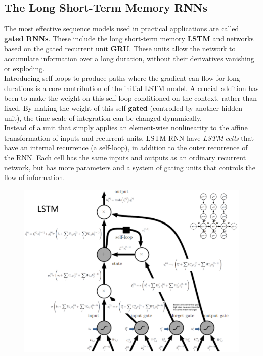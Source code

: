 \begin{multicols}{2}
	\subsection{The Long Short-Term Memory RNNs}
	The most effective sequence models used in practical applications are called \textbf{gated RNNs}.
	These include the long short-term memory \textbf{LSTM} and networks based on the gated recurrent unit \textbf{GRU}.
	These units allow the network to accumulate information over a long duration, without their derivatives vanishing or exploding.\\
	
	Introducing self-loops to produce paths where the gradient can flow for long durations is a core contribution of the initial LSTM model.
	A crucial addition has been to make the weight on this self-loop conditioned on the context, rather than fixed.
	By making the weight of this self \textbf{gated} (controlled by another hidden unit), the time scale of integration can be changed dynamically.\\
	
	Instead of a unit that simply applies an element-wise nonlinearity to the affine transformation of inputs and recurrent units, LSTM RNN have \emph{LSTM cells} that have an internal recurrence (a self-loop), in addition to the outer recurrence of the RNN.
	Each cell has the same inputs and outputs as an ordinary recurrent network, but has more parameters and a system of gating units that controls the flow of information.
\end{multicols}
\begin{figure}[H]
	\centering
	\includegraphics[width=\linewidth]{images/lstm.PNG}
\end{figure}
